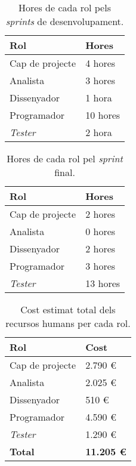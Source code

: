 \begin{table}[ht]
    \begin{center}
    \begin{tabular}{| l | l |}
        \hline
            \textbf{Rol}        & \textbf{Hores}\\ 
        \hline 
            Cap de projecte     &   4 hores     \\
            Analista            &   3 hores     \\
            Dissenyador         &   1 hora      \\
            Programador         &   10 hores    \\
            \textit{Tester}     &   2 hora      \\
        \hline
    \end{tabular}
    \end{center}
    \caption{Hores de cada rol pels \textit{sprints} de desenvolupament. \label{tab:hores_rol}}
\end{table}

\begin{table}[ht]
    \begin{center}
    \begin{tabular}{| l | l |}
        \hline
            \textbf{Rol}        & \textbf{Hores}\\ 
        \hline 
            Cap de projecte     &   2 hores     \\
            Analista            &   0 hores     \\
            Dissenyador         &   2 hores      \\
            Programador         &   3 hores     \\
            \textit{Tester}     &   13 hores    \\
        \hline
    \end{tabular}
    \end{center}
    \caption{Hores de cada rol pel \textit{sprint} final. \label{tab:hores_rol_ultim}}
\end{table}

\begin{table}[ht]
    \begin{center}
    \begin{tabular}{| l | l |}
        \hline
            \textbf{Rol}        &   \textbf{Cost}   \\ 
        \hline 
            Cap de projecte     &   2.790 \euro     \\
            Analista            &   2.025 \euro     \\
            Dissenyador         &   510 \euro       \\
            Programador         &   4.590 \euro     \\
            \textit{Tester}     &   1.290 \euro     \\
        \hline 
            \textbf{Total}      & \textbf{11.205 \euro}\\
        \hline
    \end{tabular}
    \end{center}
    \caption{Cost estimat total dels recursos humans per cada rol. \label{tab:recursos_humans_total}}
\end{table}


